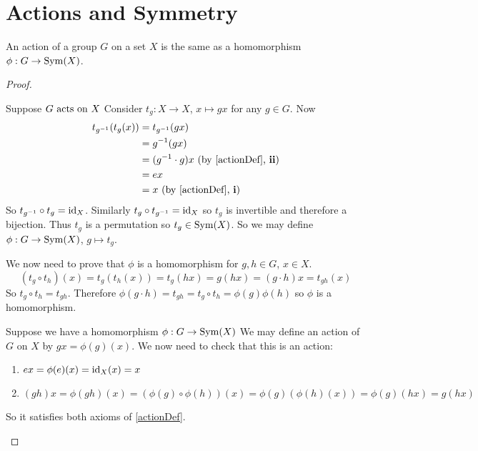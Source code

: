 \documentclass[../main.tex]{subfiles}
\begin{document}
\section{Actions and Symmetry}
\begin{theorem}
  An action of a group $G$ on a set $X$ is the same as a homomorphism $\phi : G \to \operatorname{Sym}(X)$.
  \label{actionHomTheorem}
\end{theorem}
\begin{proof}
  \begin{proofdirection}{Suppose $G \text{ acts on } X$}
    Consider $t_g : X \to X$, $x \mapsto gx$ for any $g \in G$.
    Now
    \begin{align*}
      t_{g^{-1}}(t_g(x)) &= t_{g^{-1}}(gx) \\
                         &= g^{-1}(gx) \\
                         &= (g^{-1} \cdot g)x \text{ (by \cref{actionDef}, \textbf{ii})}\\
                         &= ex \\
                         &= x \text{ (by \cref{actionDef}, \textbf{i})}
    \end{align*}
    So $t_{g^{-1}} \circ t_g  = \mathrm{id}_X$.
    Similarly $t_g \circ t_{g^{-1}} = \mathrm{id}_X$ so $t_g$ is invertible and therefore a bijection.
    Thus $t_g$ is a permutation so $t_g \in \operatorname{Sym}(X)$.
    So we may define $\phi: G \to \operatorname{Sym}(X)$, $g \mapsto t_g$.

    We now need to prove that $\phi$ is a homomorphism for $g, h \in G$, $x \in X$.
    \[
      (t_g \circ t_h)(x) = t_g(t_h(x)) = t_g(hx) = g(hx) = (g \cdot h)x = t_{gh}(x)
    \]
    So $t_g \circ t_h = t_{gh}$.
    Therefore $\phi(g \cdot h) = t_{gh} = t_g \circ t_h = \phi(g)\phi(h)$ so $\phi$ is a homomorphism.
  \end{proofdirection}
  \begin{proofdirection}{Suppose we have a homomorphism $\phi: G \to \operatorname{Sym}(X)$}
    We may define an action of $G$ on $X$ by $gx = \phi(g)(x)$.
    We now need to check that this is an action:
    \begin{enumerate}
      \item $ex = \phi(e)(x) = \mathrm{id}_X(x) = x$
      \item $(gh)x = \phi(gh)(x) = (\phi(g) \circ \phi(h))(x) = \phi(g)(\phi(h)(x)) = \phi(g)(hx) = g(hx)$
    \end{enumerate}
    So it satisfies both axioms of \cref{actionDef}.
  \end{proofdirection}
\end{proof}
\end{document}
